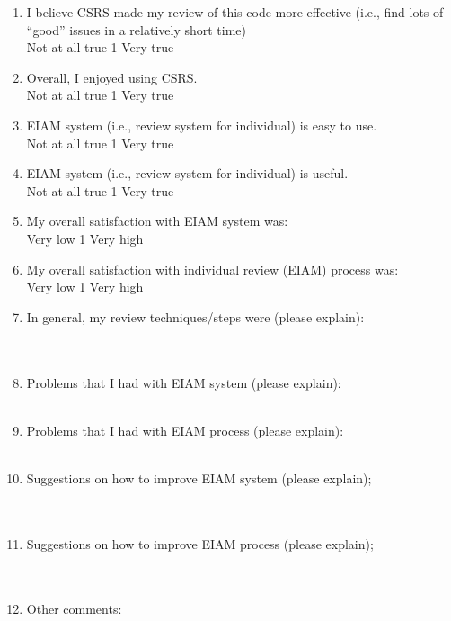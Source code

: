 \begin {enumerate}
\item I believe CSRS made my review of this code more effective
(i.e., find lots of ``good'' issues in a relatively short time)
\\
Not at all true \hfill 1    
\hfill Very true\\

\item Overall, I enjoyed using CSRS.
\\
Not at all true \hfill 1    
\hfill Very true\\


\item EIAM system (i.e., review system for individual) is easy to use.
\\
Not at all true \hfill 1     \hfill Very true\\


\item EIAM system (i.e., review system for individual) is useful. 
\\
Not at all true \hfill 1    
\hfill Very true\\

\item My overall satisfaction with EIAM system was:
\\
Very low \hfill 1     \hfill Very high\\

\item My overall satisfaction with individual review (EIAM) process
was:
\\
Very low \hfill 1     \hfill Very high\\

\item In general, my review techniques/steps were (please explain):
\\
\\
\\
\item Problems that I had with EIAM system (please explain):
\\
\\
\item Problems that I had with EIAM process (please explain):
\\
\\
\item Suggestions on how to improve EIAM system (please explain);
\\
\\
\\
\item Suggestions on how to improve EIAM process (please explain);
\\
\\
\\
\item Other comments:

\end{enumerate}





